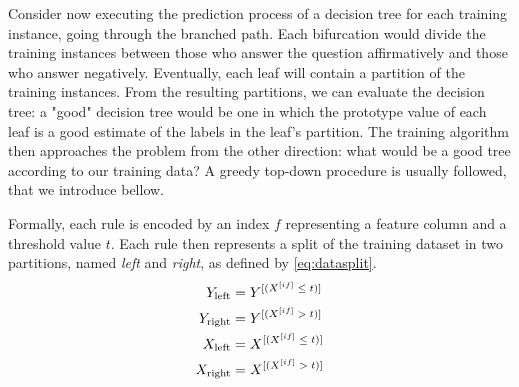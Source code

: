 

Consider now executing the prediction process of a decision tree for each training instance, going through the branched path. Each bifurcation would divide the training instances between those who answer the question affirmatively and those who answer negatively. Eventually, each leaf will contain a partition of the training instances.
From the resulting partitions, we can evaluate the decision tree:
a "good" decision tree would be one in which the prototype value of each leaf is a good estimate of the labels in the leaf's partition.
%
The training algorithm then approaches the problem from the other direction: what would be a good tree according to our training data?
A greedy top-down procedure is usually followed, that we introduce bellow.

Formally, each rule is encoded by an index $f$ representing a feature column and a threshold value $t$. Each rule then represents a split of the training dataset in two partitions, named \emph{left} and \emph{right}, as defined by \autoref{eq:datasplit}.
%
\begin{equation}
    \begin{split} %
        Y_\text{left} &=Y\el{(X\el{if} \; \le \; t)} \\
        Y_\text{right} &=Y\el{(X\el{if} \; > \; t)} \\
        X_\text{left} &=X\el{(X\el{if} \; \le \; t)} \\
        X_\text{right} &=X\el{(X\el{if} \; > \; t)}
    \end{split}
    \label{eq:datasplit}
\end{equation}

